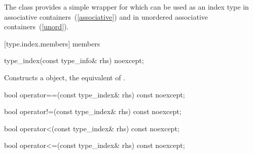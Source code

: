 \pnum
The class  provides a simple wrapper for
 which can be used as an index type in associative
containers~(\ref{associative}) and in unordered associative
containers~(\ref{unord}).

[type.index.members]{ members}

%
\begin{itemdecl}
type_index(const type_info& rhs) noexcept;
\end{itemdecl}

\begin{itemdescr}
\pnum
\effects Constructs a  object, the equivalent of .
\end{itemdescr}

%
%
\begin{itemdecl}
bool operator==(const type_index& rhs) const noexcept;
\end{itemdecl}

\begin{itemdescr}
\pnum
\returns {}
\end{itemdescr}

%
%
\begin{itemdecl}
bool operator!=(const type_index& rhs) const noexcept;
\end{itemdecl}

\begin{itemdescr}
\pnum
\returns {}
\end{itemdescr}

%
%
\begin{itemdecl}
bool operator<(const type_index& rhs) const noexcept;
\end{itemdecl}

\begin{itemdescr}
\pnum
\returns {}
\end{itemdescr}

%
%
\begin{itemdecl}
bool operator<=(const type_index& rhs) const noexcept;
\end{itemdecl}

